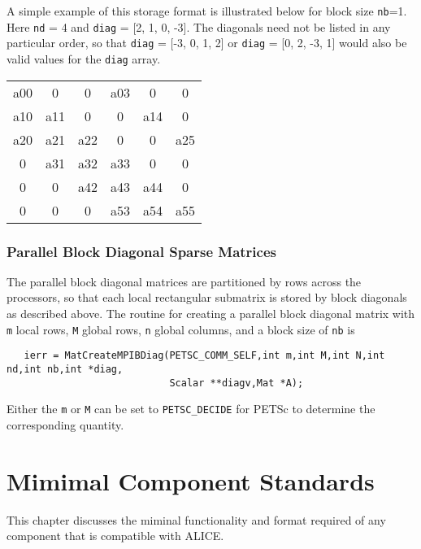 A simple example of this storage format is illustrated below for block
size {\tt nb}=1. 
Here {\tt nd} = 4 and {\tt diag} = [2, 1, 0, -3]. The
diagonals need not be listed in any particular order, so that
{\tt diag} = [-3, 0, 1, 2] or {\tt diag} = [0, 2, -3, 1] would also
be valid values for the {\tt diag} array. 

\begin{center}
\begin{tabular}{| c c c c c c |}
\hline
a00  &0    &0    &a03  &0    &0\\
a10  &a11  &0    &0    &a14  &0\\
a20  &a21  &a22  &0    &0    &a25\\
0    &a31  &a32  &a33  &0    &0\\
0    &0    &a42  &a43  &a44  &0\\
0    &0    &0    &a53  &a54  &a55\\
\hline
\end{tabular}
\end{center}

\subsection{Parallel Block Diagonal Sparse Matrices}

The parallel block diagonal matrices are partitioned by rows across
the processors, so that each local rectangular submatrix is stored by
block diagonals as described above.  The routine for creating a
parallel block diagonal matrix with {\tt m} local rows, {\tt M} global
rows, {\tt n} global columns, and a block size of {\tt nb} is
\begin{verbatim}
   ierr = MatCreateMPIBDiag(PETSC_COMM_SELF,int m,int M,int N,int nd,int nb,int *diag,
                            Scalar **diagv,Mat *A);
\end{verbatim}
Either the {\tt m} or {\tt M} can be set to {\tt PETSC\_DECIDE} for PETSc
to determine the corresponding quantity.

\chapter{Mimimal Component Standards}
This chapter discusses the miminal functionality and format required of any 
component that is compatible with ALICE. 





